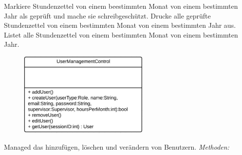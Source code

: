 \begin{itemize}
\begin{itemize}
\begin{itemize}
                             Markiere Stundenzettel von einem beestimmten Monat von einem bestimmten Jahr als geprüft und mache sie schreibgeschützt.
                             Drucke alle geprüfte Stundenzettel von einem bestimmten Monat von einem bestimmten Jahr aus.
                             Listet alle Stundenzettel von einem bestimmten Monat von einem bestimmten Jahr.
                        \end{itemize}

                    \begin{figure}[htb]
                    \centering
                    \includegraphics[width=6.5cm]{Diagramms/class/singleclass/ControlUM.pdf}
                    \end{figure}
                    \newline
                        Managed das hinzufügen, löschen und verändern von Benutzern.
                                                           \newline
                    \emph{Methoden:}
                        \begin{itemize}
                        \end{itemize}


\end{itemize}
\end{itemize}
